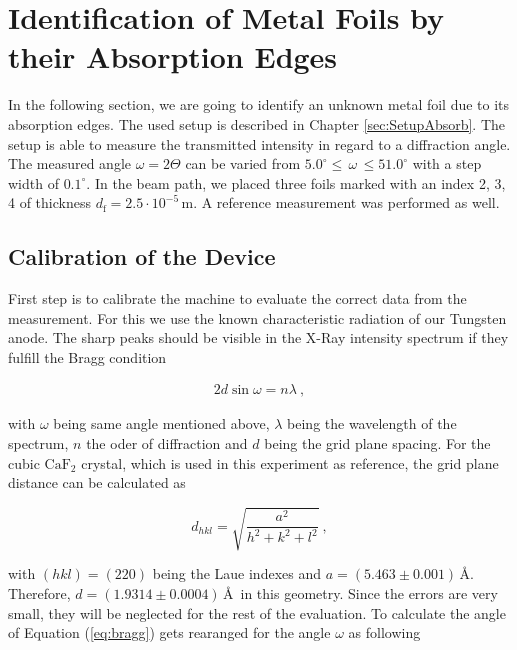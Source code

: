 \section{Identification of Metal Foils by their Absorption Edges}
\label{sec:identify}

In the following section, we are going to identify an unknown metal foil due to its absorption edges. The used setup is described in Chapter \ref{sec:SetupAbsorb}.
The setup is able to measure the transmitted intensity in regard to a diffraction angle. The measured angle $\omega = 2\Theta$ can be varied from $5.0^\circ \leq \, \omega \, \leq 51.0^\circ$ with a step width of $0.1^\circ$. In the beam path, we placed three foils marked with an index 2, 3, 4 of thickness $d_\mathrm{f} = 2.5\cdot10^{-5}$\,m. A reference measurement was performed as well.

\subsection{Calibration of the Device}
\label{sub:calibration}



First step is to calibrate the machine to evaluate the correct data from the measurement. For this we use the known characteristic radiation of our Tungsten anode. The sharp peaks should be visible in the X-Ray intensity spectrum if they fulfill the Bragg condition

\begin{gather}
    2 d \sin{\omega} = n \lambda~,
    \label{eq:bragg}
\end{gather}

with $\omega$ being same angle mentioned above, $ \lambda $ being the wavelength of the spectrum, $n$ the oder of diffraction and $d$ being the grid plane spacing. For the cubic $\mathrm{CaF}_2$ crystal, which is used in this experiment as reference, the grid plane distance can be calculated as

\begin{equation}
    d_{hkl} = \sqrt{\frac{a^2}{h^2+k^2+l^2}}~,
\end{equation}

with $(hkl) = (220) $ being the Laue indexes and $a = (5.463 \pm 0.001)$\,\AA. Therefore, $d = (1.9314 \pm 0.0004)$\,\AA~in this geometry. Since the errors are very small, they will be neglected for the rest of the evaluation. To calculate the angle of Equation (\ref{eq:bragg}) gets rearanged for the angle $\omega$ as following

